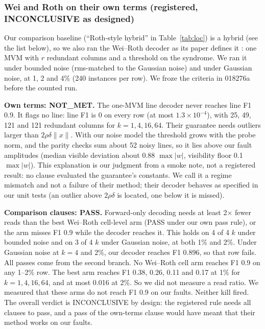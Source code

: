 \documentclass[journal]{IEEEtran}
\begin{document}
\subsubsection{Wei and Roth on their own terms (registered, INCONCLUSIVE as designed)}
Our comparison baseline (``Roth-style hybrid'' in Table~\ref{tab:loc}) is a hybrid (see the list below), so we also ran the Wei--Roth decoder as its paper defines it \cite{weiroth2024}: one MVM with $r$ redundant columns and a threshold on the syndrome. We ran it under bounded noise (rms-matched to the Gaussian noise) and under Gaussian noise, at 1, 2 and 4\% (240 instances per row). We froze the criteria in 018276a before the counted run.

\textbf{Own terms: NOT\_MET.} The one-MVM line decoder never reaches line F1 0.9. It flags no line: line F1 is 0 on every row (at most $1.3\times10^{-4}$), with 25, 49, 121 and 121 redundant columns for $k=1,4,16,64$.
Their guarantee needs outliers larger than $2\rho\delta\|x\|$. With our noise model the threshold grows with the probe norm, and the parity checks sum about 52 noisy lines, so it lies above our fault amplitudes (median visible deviation about 0.88 $\max|w|$, visibility floor 0.1 $\max|w|$). This explanation is our judgment from a smoke note, not a registered result: no clause evaluated the guarantee's constants. We call it a regime mismatch and not a failure of their method; their decoder behaves as specified in our unit tests (an outlier above $2\rho\delta$ is located, one below it is missed).

\textbf{Comparison clauses: PASS.} Forward-only decoding needs at least 2$\times$ fewer reads than the best Wei--Roth cell-level arm (PASS under our own pass rule), or the arm misses F1 0.9 while the decoder reaches it. This holds on 4 of 4 $k$ under bounded noise and on 3 of 4 $k$ under Gaussian noise, at both 1\% and 2\%. Under Gaussian noise at $k=4$ and 2\%, our decoder reaches F1 0.896, so that row fails.
All passes come from the second branch. No Wei--Roth cell arm reaches F1 0.9 on any 1--2\% row. The best arm reaches F1 0.38, 0.26, 0.11 and 0.17 at 1\% for $k=1,4,16,64$, and at most 0.016 at 2\%. So we did not measure a read ratio. We measured that these arms do not reach F1 0.9 on our faults. Neither kill fired.
The overall verdict is INCONCLUSIVE by design: the registered rule needs all clauses to pass, and a pass of the own-terms clause would have meant that their method works on our faults.
\end{document}
